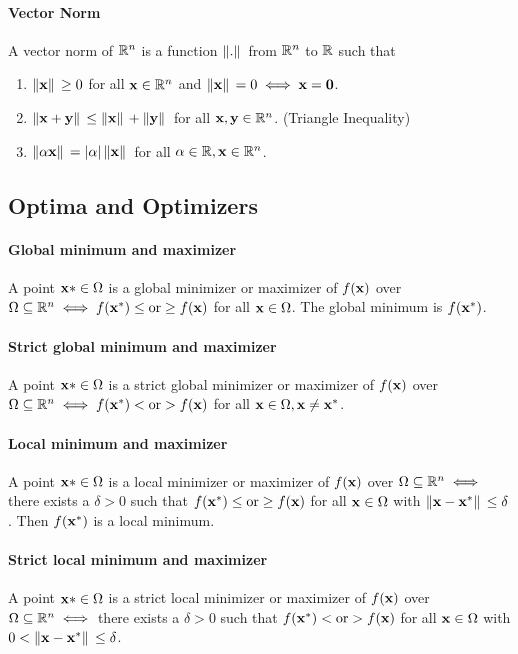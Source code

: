 \paragraph{Vector Norm}
A vector norm of \(\mathbb{R}^n\) is a function \(\norm*{.}\) from \(\mathbb{R}^n\) to \(\mathbb{R}\) such that
\begin{enumerate}
    \item \(\norm*{\mathbf{x}} \geq 0\) for all \(\mathbf{x} \in \mathbb{R}^n\) and \(\norm*{\mathbf{x}} = 0 \iff \mathbf{x} = \mathbf{0}\).
    \item \(\norm*{\mathbf{x} + \mathbf{y}} \leq \norm*{\mathbf{x}} + \norm*{\mathbf{y}}\) for all \(\mathbf{x}, \mathbf{y} \in \mathbb{R}^n\). \qquad (Triangle Inequality)
    \item \(\norm*{\alpha\mathbf{x}} = \abs*{\alpha}\norm*{\mathbf{x}}\) for all \(\alpha \in \mathbb{R}, \mathbf{x} \in \mathbb{R}^n\).
\end{enumerate}

\subsection{Optima and Optimizers}
\paragraph{Global minimum and maximizer}
A point \(\mathbf{x}* \in \Omega\) is a global minimizer or maximizer of \(f(\mathbf{x})\) over \(\Omega \subseteq \mathbb{R}^n \iff f(\mathbf{x}^*) \leq \text{or} \geq f(\mathbf{x})\) for all \(\mathbf{x} \in \Omega\). The global minimum is \(f(\mathbf{x}^*)\).

\paragraph{Strict global minimum and maximizer}
A point \(\mathbf{x}* \in \Omega\) is a strict global minimizer or maximizer of \(f(\mathbf{x})\) over \(\Omega \subseteq \mathbb{R}^n \iff f(\mathbf{x}^*) < \text{or} > f(\mathbf{x})\) for all \(\mathbf{x} \in \Omega, \mathbf{x} \neq \mathbf{x}^*\).

\paragraph{Local minimum and maximizer}
A point \(\mathbf{x}* \in \Omega\) is a local minimizer or maximizer of \(f(\mathbf{x})\) over \(\Omega \subseteq \mathbb{R}^n \iff\) there exists a \(\delta > 0\) such that \(f(\mathbf{x}^*) \leq \text{or} \geq f(\mathbf{x})\) for all \(\mathbf{x} \in \Omega\) with \(\norm*{\mathbf{x} - \mathbf{x}^*} \leq \delta\). Then \(f(\mathbf{x}^*)\) is a local minimum.

\paragraph{Strict local minimum and maximizer}
A point \(\mathbf{x}* \in \Omega\) is a strict local minimizer or maximizer of \(f(\mathbf{x})\) over \(\Omega \subseteq \mathbb{R}^n \iff\) there exists a \(\delta > 0\) such that \(f(\mathbf{x}^*) < \text{or} > f(\mathbf{x})\) for all \(\mathbf{x} \in \Omega\) with \(0 < \norm*{\mathbf{x} - \mathbf{x}^*} \leq \delta\).

